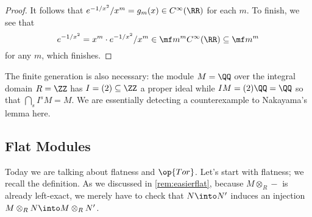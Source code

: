 \begin{proof}
	It follows that $e^{-1/x^2}/x^m=g_m(x)\in C^\infty(\RR)$ for each $m$. To finish, we see that
	\[e^{-1/x^2}=x^m\cdot e^{-1/x^2}/x^m\in\mf m^mC^\infty(\RR)\subseteq\mf m^m\]
	for any $m$, which finishes.
\end{proof}
\begin{remark}[Nir]
	The finite generation is also necessary: the module $M=\QQ$ over the integral domain $R=\ZZ$ has $I=(2)\subseteq\ZZ$ a proper ideal while $IM=(2)\QQ=\QQ$ so that $\bigcap_sI^sM=M$. We are essentially detecting a counterexample to Nakayama's lemma here.
\end{remark}

\subsection{Flat Modules}
Today we are talking about flatness and $\op{Tor}$. Let's start with flatness; we recall the definition.
\flatdefi*
\noindent As we discussed in \autoref{rem:easierflat}, because $M\otimes_R-$ is already left-exact, we merely have to check that $N\into N'$ induces an injection $M\otimes_RN\into M\otimes_RN'$.

